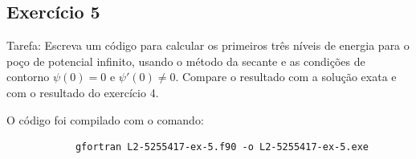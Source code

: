 \documentclass[12pt, a4paper]{article} %
\begin{document}
    \subsection{Exerc\'icio 5}

        Tarefa: Escreva um c\'odigo para calcular os primeiros tr\^es n\'iveis de energia para o po\c{c}o de potencial inﬁnito, usando o m\'etodo da secante e as condi\c{c}\~oes de contorno $\psi(0) = 0$ e
        $\psi '(0) \neq  0$. Compare o resultado com a solu\c{c}\~ao exata e com o resultado do exerc\'icio 4.


        O c\'odigo foi compilado com o comando:
        \begin{verbatim}
            gfortran L2-5255417-ex-5.f90 -o L2-5255417-ex-5.exe
        \end{verbatim}
\end{document}

